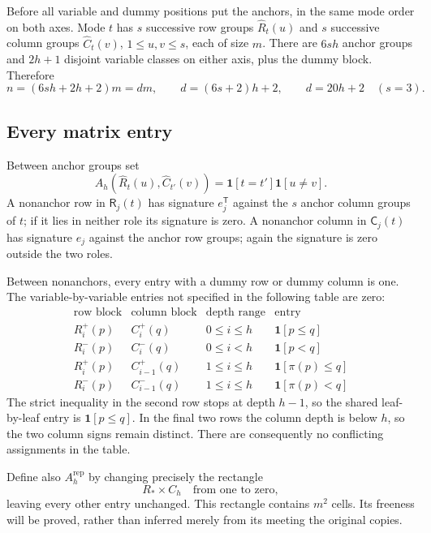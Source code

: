 \documentclass[11pt]{article}
\theoremstyle{definition}
\newcommand{\one}{\mathbf 1}
\newcommand{\Rset}{\mathsf R}
\newcommand{\Cset}{\mathsf C}
\begin{document}
Before all variable and dummy positions put the anchors, in the same
mode order on both axes. Mode \(t\) has \(s\) successive row groups
\(\widehat R_t(u)\) and \(s\) successive column groups
\(\widehat C_t(v)\), \(1\le u,v\le s\), each of size \(m\).
There are \(6sh\) anchor groups and \(2h+1\) disjoint variable classes
on either axis, plus the dummy block. Therefore
\begin{equation}
 n=(6sh+2h+2)m=dm,\qquad d=(6s+2)h+2,
 \qquad d=20h+2\quad(s=3).
 \label{eq:n-size}
\end{equation}

\subsection{Every matrix entry}

Between anchor groups set
\[
 A_h(\widehat R_t(u),\widehat C_{t'}(v))
 =\one[t=t']\one[u\ne v].
\]
A nonanchor row in \(\Rset_j(t)\) has signature \(e_j^{\mathsf T}\)
against the \(s\) anchor column groups of \(t\); if it lies in neither
role its signature is zero. A nonanchor column in \(\Cset_j(t)\)
has signature \(e_j\) against the anchor row groups; again the signature
is zero outside the two roles.

Between nonanchors, every entry with a dummy row or dummy column is one.
The variable-by-variable entries not specified in the following table
are zero:
\begin{equation}
\begin{array}{ccc|c}
\text{row block}&\text{column block}&\text{depth range}&\text{entry}\\ \hline
R_i^+(p)&C_i^+(q)&0\le i\le h&\one[p\le q]\\
R_i^-(p)&C_i^-(q)&0\le i<h&\one[p<q]\\
R_i^+(p)&C_{i-1}^+(q)&1\le i\le h&\one[\pi(p)\le q]\\
R_i^-(p)&C_{i-1}^-(q)&1\le i\le h&\one[\pi(p)<q]
\end{array}
\label{eq:entries}
\end{equation}
The strict inequality in the second row stops at depth \(h-1\), so the
shared leaf-by-leaf entry is \(\one[p\le q]\). In the final two rows
the column depth is below \(h\), so the two column signs remain distinct.
There are consequently no conflicting assignments in the table.

Define also \(A_h^{\mathrm{rep}}\) by changing precisely the rectangle
\begin{equation}
 R_*\times C_h\quad\text{from one to zero},
 \label{eq:repair}
\end{equation}
leaving every other entry unchanged. This rectangle contains \(m^2\)
cells. Its freeness will be proved, rather than inferred merely from
its meeting the original copies.
\end{document}
